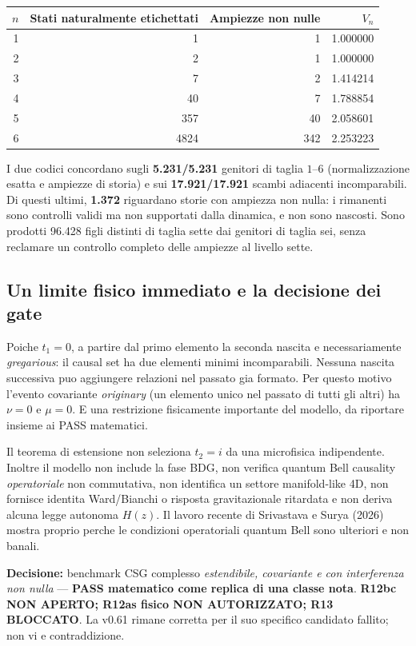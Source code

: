 \documentclass[11pt,a4paper]{article}
\begin{document}
\begin{center}
\small
\begin{tabular}{rrrr}
\toprule
$n$ & Stati naturalmente etichettati & Ampiezze non nulle & $V_n$ \\
\midrule
1 & 1 & 1 & 1.000000 \\
2 & 2 & 1 & 1.000000 \\
3 & 7 & 2 & 1.414214 \\
4 & 40 & 7 & 1.788854 \\
5 & 357 & 40 & 2.058601 \\
6 & 4824 & 342 & 2.253223 \\
\bottomrule
\end{tabular}
\end{center}
I due codici concordano sugli \textbf{5.231/5.231} genitori di taglia $1$--$6$ (normalizzazione esatta e ampiezze di storia) e sui \textbf{17.921/17.921} scambi adiacenti incomparabili. Di questi ultimi, \textbf{1.372} riguardano storie con ampiezza non nulla: i rimanenti sono controlli validi ma non supportati dalla dinamica, e non sono nascosti. Sono prodotti 96.428 figli distinti di taglia sette dai genitori di taglia sei, senza reclamare un controllo completo delle ampiezze al livello sette.

\subsection*{Un limite fisico immediato e la decisione dei gate}
Poiche $t_1=0$, a partire dal primo elemento la seconda nascita e necessariamente \emph{gregarious}: il causal set ha due elementi minimi incomparabili. Nessuna nascita successiva puo aggiungere relazioni nel passato gia formato. Per questo motivo l'evento covariante \emph{originary} (un elemento unico nel passato di tutti gli altri) ha $\nu=0$ e $\mu=0$. E una restrizione fisicamente importante del modello, da riportare insieme ai PASS matematici.

Il teorema di estensione non seleziona $t_2=i$ da una microfisica indipendente. Inoltre il modello non include la fase BDG, non verifica quantum Bell causality \emph{operatoriale} non commutativa, non identifica un settore manifold-like 4D, non fornisce identita Ward/Bianchi o risposta gravitazionale ritardata e non deriva alcuna legge autonoma $H(z)$. Il lavoro recente di Srivastava e Surya (2026) mostra proprio perche le condizioni operatoriali quantum Bell sono ulteriori e non banali. 

\textbf{Decisione:} benchmark CSG complesso \emph{estendibile, covariante e con interferenza non nulla} --- \textbf{PASS matematico come replica di una classe nota}. \textbf{R12bc NON APERTO; R12as fisico NON AUTORIZZATO; R13 BLOCCATO}. La v0.61 rimane corretta per il suo specifico candidato fallito; non vi e contraddizione.
\end{document}
